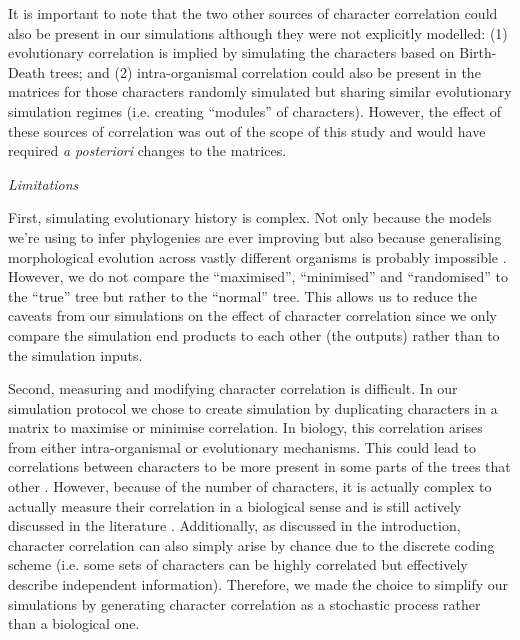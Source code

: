 \documentclass[12pt,letterpaper]{article}
\renewcommand{\subsection}[1]{%
\bigskip
\begin{center}
\begin{large}
\normalfont\itshape #1
\end{large}
\end{center}}
\begin{document}
It is important to note that the two other sources of character correlation could also be present in our simulations although they were not explicitly modelled:
(1) evolutionary correlation is implied by simulating the characters based on Birth-Death trees;
and (2) intra-organismal correlation could also be present in the matrices for those characters randomly simulated but sharing similar evolutionary simulation regimes (i.e. creating ``modules'' of characters).
However, the effect of these sources of correlation was out of the scope of this study and would have required \textit{a posteriori} changes to the matrices.%

\subsection{Limitations}
First, simulating evolutionary history is complex.
Not only because the models we're using to infer phylogenies are ever improving \citep[e.g.][]{heath2014fossilized,Wright01072016} but also because generalising morphological evolution across vastly different organisms is probably impossible \citep[see constrasted discussions from][]{GoloboffEmpirical,OReillyEmpirical}.
However, we do not compare the ``maximised'', ``minimised'' and ``randomised'' to the ``true'' tree but rather to the ``normal'' tree.
This allows us to reduce the caveats from our simulations on the effect of character correlation since we only compare the simulation end products to each other (the outputs) rather than to the simulation inputs.

Second, measuring and modifying character correlation is difficult. 
In our simulation protocol we chose to create simulation by duplicating characters in a matrix to maximise or minimise correlation.
In biology, this correlation arises from either intra-organismal or evolutionary mechanisms.
This could lead to correlations between characters to be more present in some parts of the trees that other \citep[e.g. in the case of inapplicable data ][]{BrazeauNA}.
However, because of the number of characters, it is actually complex to actually measure their correlation in a biological sense and is still actively discussed in the literature \citep{Lande1983,Maddison1990,Pagel1994,Pagel2006,goswami2006morphological,goswami2010,goswami2014macroevolutionary,Grabowski2016}.
Additionally, as discussed in the introduction, character correlation can also simply arise by chance due to the discrete coding scheme (i.e. some sets of characters can be highly correlated but effectively describe independent information).
Therefore, we made the choice to simplify our simulations by generating character correlation as a stochastic process rather than a biological one.
\end{document}
